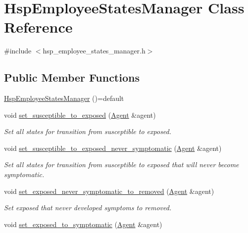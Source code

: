 \hypertarget{classHspEmployeeStatesManager}{}\section{Hsp\+Employee\+States\+Manager Class Reference}
\label{classHspEmployeeStatesManager}


{\ttfamily \#include $<$hsp\+\_\+employee\+\_\+states\+\_\+manager.\+h$>$}

\subsection*{Public Member Functions}
\begin{DoxyCompactItemize}
\item 
\hyperlink{classHspEmployeeStatesManager_a76b1f4aa0c3bc03c072878c5678ea420}{Hsp\+Employee\+States\+Manager} ()=default
\item 
void \hyperlink{classHspEmployeeStatesManager_a4fea72f10a69fe01212a847b43969f3e}{set\+\_\+susceptible\+\_\+to\+\_\+exposed} (\hyperlink{classAgent}{Agent} \&agent)
\begin{DoxyCompactList}\small\item\em Set all states for transition from susceptible to exposed. \end{DoxyCompactList}\item 
void \hyperlink{classHspEmployeeStatesManager_aa745324359627d4497c255be7b9615e1}{set\+\_\+susceptible\+\_\+to\+\_\+exposed\+\_\+never\+\_\+symptomatic} (\hyperlink{classAgent}{Agent} \&agent)
\begin{DoxyCompactList}\small\item\em Set all states for transition from susceptible to exposed that will never become symptomatic. \end{DoxyCompactList}\item 
void \hyperlink{classHspEmployeeStatesManager_a7f53c872e0297fae9a9f8ef78d861682}{set\+\_\+exposed\+\_\+never\+\_\+symptomatic\+\_\+to\+\_\+removed} (\hyperlink{classAgent}{Agent} \&agent)
\begin{DoxyCompactList}\small\item\em Set exposed that never developed symptoms to removed. \end{DoxyCompactList}\item 
void \hyperlink{classHspEmployeeStatesManager_a0d0d4d403644011774c738435a226ea2}{set\+\_\+exposed\+\_\+to\+\_\+symptomatic} (\hyperlink{classAgent}{Agent} \&agent)

\end{DoxyCompactItemize}
